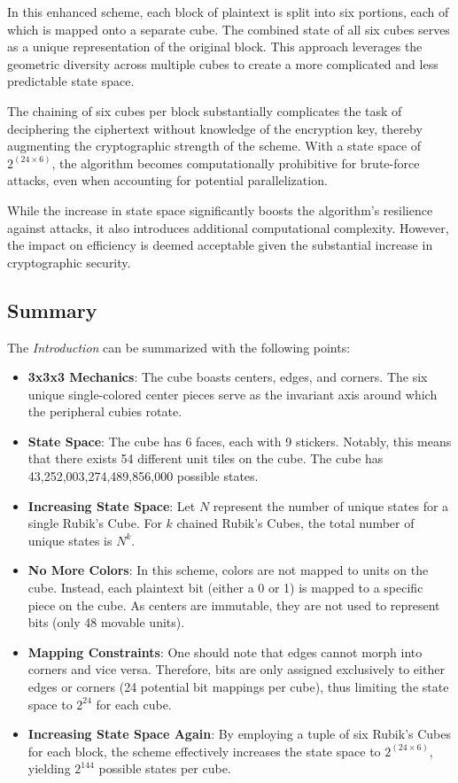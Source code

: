 \documentclass[12pt]{article}
\begin{document}
In this enhanced scheme, each block of plaintext is split into six portions, each of which is mapped onto a separate cube. The combined state of all six cubes serves as a unique representation of the original block. This approach leverages the geometric diversity across multiple cubes to create a more complicated and less predictable state space.

The chaining of six cubes per block substantially complicates the task of deciphering the ciphertext without knowledge of the encryption key, thereby augmenting the cryptographic strength of the scheme. With a state space of \(2^{(24 \times 6)}\), the algorithm becomes computationally prohibitive for brute-force attacks, even when accounting for potential parallelization.

While the increase in state space significantly boosts the algorithm's resilience against attacks, it also introduces additional computational complexity. However, the impact on efficiency is deemed acceptable given the substantial increase in cryptographic security.

\subsection{Summary}

The \textit{Introduction} can be summarized with the following points:

\begin{itemize}
    \item \textbf{3x3x3 Mechanics}: The cube boasts centers, edges, and corners. The six unique single-colored center pieces serve as the invariant axis around which the peripheral cubies rotate.
    \item \textbf{State Space}: The cube has 6 faces, each with 9 stickers. Notably, this means that there exists 54 different unit tiles on the cube. The cube has 43,252,003,274,489,856,000 possible states.
    \item \textbf{Increasing State Space}: Let \( N \) represent the number of unique states for a single Rubik's Cube. For \( k \) chained Rubik's Cubes, the total number of unique states is \( N^k \). 
    \item \textbf{No More Colors}: In this scheme, colors are not mapped to units on the cube. Instead, each plaintext bit (either a 0 or 1) is mapped to a specific piece on the cube. As centers are immutable, they are not used to represent bits (only 48 movable units).
    \item \textbf{Mapping Constraints}: One should note that edges cannot morph into corners and vice versa. Therefore, bits are only assigned exclusively to either edges or corners (24 potential bit mappings per cube), thus limiting the state space to \(2^{24}\) for each cube.
    \item \textbf{Increasing State Space Again}: By employing a tuple of six Rubik's Cubes for each block, the scheme effectively increases the state space to \(2^{(24 \times 6)}\), yielding \(2^{144}\) possible states per cube.
\end{itemize}
\end{document}
